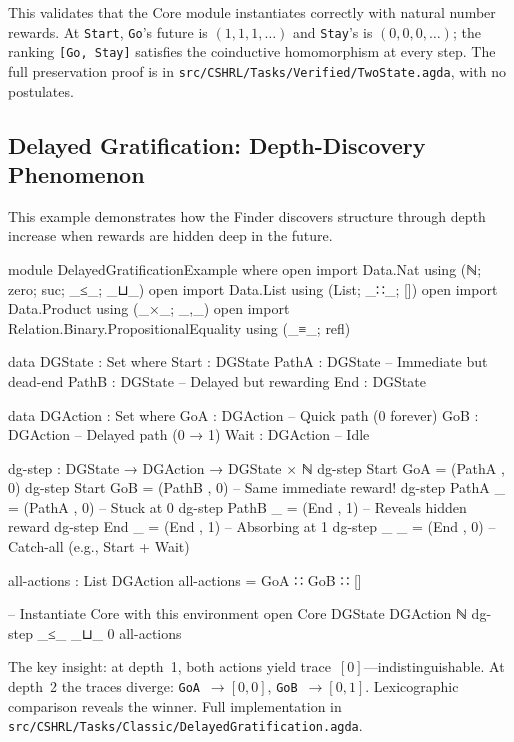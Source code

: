 \documentclass[9pt,a4paper]{article}
\newcommand{\fpath}[1]{\nolinkurl{#1}}
\theoremstyle{plain}
\theoremstyle{definition}
\theoremstyle{remark}
\begin{document}
\noindent This validates that the Core module instantiates correctly with natural number rewards.  At \texttt{Start}, \texttt{Go}'s future is $(1, 1, 1, \ldots)$ and \texttt{Stay}'s is $(0, 0, 0, \ldots)$; the ranking \texttt{[Go, Stay]} satisfies the coinductive homomorphism at every step.  The full preservation proof is in \fpath{src/CSHRL/Tasks/Verified/TwoState.agda}, with no postulates.

\subsection{Delayed Gratification: Depth-Discovery Phenomenon}

This example demonstrates how the Finder discovers structure through depth increase when rewards are hidden deep in the future.

\begin{code}[hide]
module DelayedGratificationExample where
  open import Data.Nat using (ℕ; zero; suc; _≤_; _⊔_)
  open import Data.List using (List; _∷_; [])
  open import Data.Product using (_×_; _,_)
  open import Relation.Binary.PropositionalEquality using (_≡_; refl)
\end{code}
\begin{code}
  data DGState : Set where
    Start : DGState
    PathA : DGState  -- Immediate but dead-end
    PathB : DGState  -- Delayed but rewarding
    End   : DGState

  data DGAction : Set where
    GoA  : DGAction  -- Quick path (0 forever)
    GoB  : DGAction  -- Delayed path (0 → 1)
    Wait : DGAction  -- Idle

  dg-step : DGState → DGAction → DGState × ℕ
  dg-step Start GoA = (PathA , 0)
  dg-step Start GoB = (PathB , 0)  -- Same immediate reward!
  dg-step PathA _   = (PathA , 0)  -- Stuck at 0
  dg-step PathB _   = (End , 1)    -- Reveals hidden reward
  dg-step End   _   = (End , 1)    -- Absorbing at 1
  dg-step _     _   = (End , 0)    -- Catch-all (e.g., Start + Wait)

  all-actions : List DGAction
  all-actions = GoA ∷ GoB ∷ []

  -- Instantiate Core with this environment
  open Core DGState DGAction ℕ dg-step _≤_ _⊔_ 0 all-actions
\end{code}
\noindent The key insight: at depth~1, both actions yield trace~$[0]$---indistinguishable.
At depth~2 the traces diverge: \texttt{GoA}~$\to [0,0]$, \texttt{GoB}~$\to [0,1]$.
Lexicographic comparison reveals the winner. Full implementation in
\fpath{src/CSHRL/Tasks/Classic/DelayedGratification.agda}.
\end{document}

